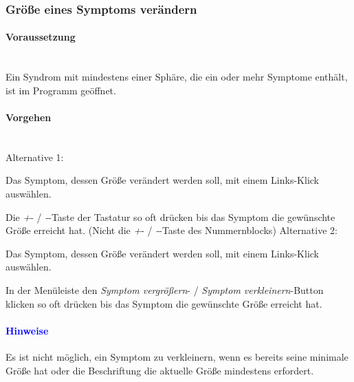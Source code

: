 \documentclass[enabledeprecatedfontcommands,fontsize=11pt,paper=a4,twoside]{scrartcl}
\newcounter{one}
\newcounter{two}[one]
\newcommand*{\hint}{\paragraph{\textcolor{blue}{Hinweise}}}
\newcommand*{\condition}{\paragraph{Voraussetzung}$\;$ \vspace{0.2cm}\\}
\newcommand*{\actions}{\paragraph{Vorgehen} $\;$\vspace{0.2cm}\\}
\newcommand*{\aOne}{\textcolor{bbe}{Alternative 1:}}
\newcommand*{\aTwo}{\textcolor{bbe}{Alternative 2:}}
\let\tempone\itemize
\let\temptwo\enditemize
\renewenvironment{itemize}{\tempone\addtolength{\itemsep}{-10.0pt}}{\temptwo}
\let\origenumerate\enumerate
\let\origendenumerate\endenumerate
\renewenvironment{enumerate}{\origenumerate \addtolength{\itemsep}{-10.0pt}}{\origendenumerate}
\begin{document}
\subsubsection{Größe eines Symptoms verändern}
					\condition 	
		Ein Syndrom mit mindestens einer Sphäre, die ein oder mehr Symptome enthält, ist im Programm geöffnet. 
		\actions
		\aOne
		\begin{enumerate}
			\item Das Symptom, dessen Größe verändert werden soll, mit einem Links-Klick auswählen. 
			\item Die \glqq\textit{+}\grqq- / \glqq\textit{-}\grqq-Taste der Tastatur so oft drücken bis das Symptom die gewünschte Größe erreicht hat. (Nicht die  \glqq\textit{+}\grqq- / \glqq\textit{-}\grqq-Taste des Nummernblocks)
		\end{enumerate}
		\aTwo
		\begin{enumerate}
			\item Das Symptom, dessen Größe verändert werden soll, mit einem Links-Klick auswählen. 
			\item  In der Menüleiste den \textit{Symptom vergrößern}- / \textit{Symptom verkleinern}-Button klicken so oft drücken bis das Symptom die gewünschte Größe erreicht hat.
		\end{enumerate}
		\hint
		\begin{itemize}
			\item Es ist nicht möglich, ein Symptom zu verkleinern, wenn es bereits seine minimale Größe hat oder die Beschriftung die aktuelle Größe mindestens erfordert. \\
		\end{itemize}
			
\end{document}
